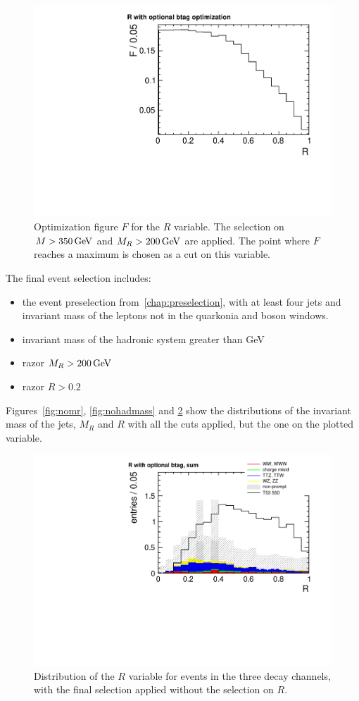 \begin{figure}[phtb]
    \centering
    \includegraphics[width=.7\textwidth]{images/pdf/cut_opt_r_optional_btag_4jets_AND_mr200_AND_had_mass350}
    \caption{Optimization figure $F$ for the $R$ variable. The selection
        on $M > \unit[350]{GeV}$ and $M_R > \unit[200]{GeV}$ are
    applied. The point where $F$ reaches a maximum is chosen as a cut on this variable.}
    \label{fig:opt_r}
\end{figure}

The final event selection includes:
\begin{itemize}
    \item the event preselection from~\ref{chap:preselection}, with at least
        four jets and invariant mass of the leptons not in the quarkonia and
        \Z boson windows.
    \item invariant mass of the hadronic system greater than
        \unit[350]{GeV}
    \item razor $M_R > \unit[200]{GeV}$
    \item razor $R > 0.2$
\end{itemize}
Figures~\ref{fig:nomr}, \ref{fig:nohadmass} and \ref{fig:nor} show the distributions of the invariant mass of the jets,
$M_R$ and $R$ with all the cuts applied, but the one on the plotted
variable.

\begin{figure}[htb]
    \centering
    \includegraphics[width=.7\textwidth]{images/pdf/4jets_AND_mr200_AND_had_mass350/r_optional_btag_sum_0}
    \caption{Distribution of the $R$ variable for events in the three decay
        channels, with the final
    selection applied without the selection on $R$.}
    \label{fig:nor}
\end{figure}

